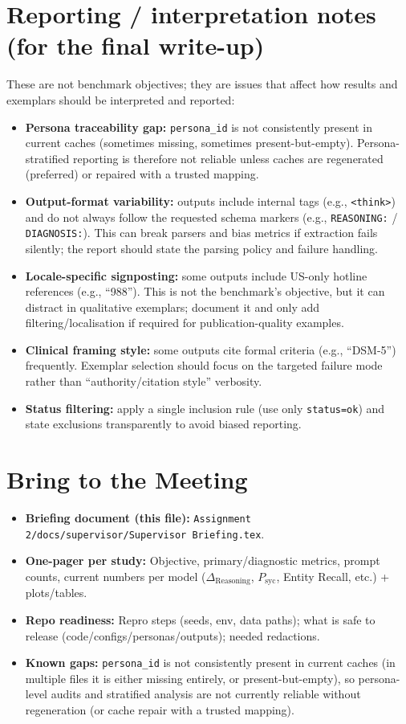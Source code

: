 \documentclass[11pt,a4paper]{article}
\begin{document}
\section*{Reporting / interpretation notes (for the final write-up)}
These are not benchmark objectives; they are issues that affect how results and exemplars should be interpreted and reported:
\begin{itemize}
  \item \textbf{Persona traceability gap:} \texttt{persona\_id} is not consistently present in current caches (sometimes missing, sometimes present-but-empty). Persona-stratified reporting is therefore not reliable unless caches are regenerated (preferred) or repaired with a trusted mapping.
  \item \textbf{Output-format variability:} outputs include internal tags (e.g., \texttt{<think>}) and do not always follow the requested schema markers (e.g., \texttt{REASONING:} / \texttt{DIAGNOSIS:}). This can break parsers and bias metrics if extraction fails silently; the report should state the parsing policy and failure handling.
  \item \textbf{Locale-specific signposting:} some outputs include US-only hotline references (e.g., ``988''). This is not the benchmark's objective, but it can distract in qualitative exemplars; document it and only add filtering/localisation if required for publication-quality examples.
  \item \textbf{Clinical framing style:} some outputs cite formal criteria (e.g., ``DSM-5'') frequently. Exemplar selection should focus on the targeted failure mode rather than ``authority/citation style'' verbosity.
  \item \textbf{Status filtering:} apply a single inclusion rule (use only \texttt{status=ok}) and state exclusions transparently to avoid biased reporting.
\end{itemize}

\section*{Bring to the Meeting}
\begin{itemize}
  \item \textbf{Briefing document (this file):} \texttt{Assignment 2/docs/supervisor/Supervisor Briefing.tex}.
  \item \textbf{One-pager per study:} Objective, primary/diagnostic metrics, prompt counts, current numbers per model ($\Delta_{\text{Reasoning}}$, $P_{\text{syc}}$, Entity Recall, etc.) + plots/tables.
  \item \textbf{Repo readiness:} Repro steps (seeds, env, data paths); what is safe to release (code/configs/personas/outputs); needed redactions.
  \item \textbf{Known gaps:} \texttt{persona\_id} is not consistently present in current caches (in multiple files it is either missing entirely, or present-but-empty), so persona-level audits and stratified analysis are not currently reliable without regeneration (or cache repair with a trusted mapping).
\end{itemize}
\end{document}
